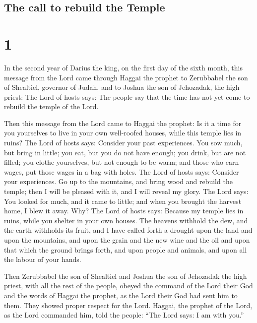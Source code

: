 \hypertarget{the-call-to-rebuild-the-temple}{%
\subsection{The call to rebuild the
Temple}\label{the-call-to-rebuild-the-temple}}

\hypertarget{section}{%
\section{1}\label{section}}

 In the second year of Darius the king, on the first day of
the sixth month, this message from the Lord came through Haggai the
prophet to Zerubbabel the son of Shealtiel, governor of Judah, and to
Joshua the son of Jehozadak, the high priest:  The Lord of
hosts says: The people say that the time has not yet come to rebuild the
temple of the Lord.

 Then this message from the Lord came to Haggai the prophet:
 Is it a time for you yourselves to live in your own
well-roofed houses, while this temple lies in ruins?  The
Lord of hosts says: Consider your past experiences.  You sow
much, but bring in little; you eat, but you do not have enough; you
drink, but are not filled; you clothe yourselves, but not enough to be
warm; and those who earn wages, put those wages in a bag with holes.
 The Lord of hosts says: Consider your experiences.
 Go up to the mountains, and bring wood and rebuild the
temple; then I will be pleased with it, and I will reveal my glory. The
Lord says:  You looked for much, and it came to little; and
when you brought the harvest home, I blew it away. Why? The Lord of
hosts says: Because my temple lies in ruins, while you shelter in your
own houses.  The heavens withhold the dew, and the earth
withholds its fruit,  and I have called forth a drought
upon the land and upon the mountains, and upon the grain and the new
wine and the oil and upon that which the ground brings forth, and upon
people and animals, and upon all the labour of your hands.

 Then Zerubbabel the son of Shealtiel and Joshua the son of
Jehozadak the high priest, with all the rest of the people, obeyed the
command of the Lord their God and the words of Haggai the prophet, as
the Lord their God had sent him to them. They showed proper respect for
the Lord.  Haggai, the prophet of the Lord, as the Lord
commanded him, told the people: ``The Lord says: I am with you.''

